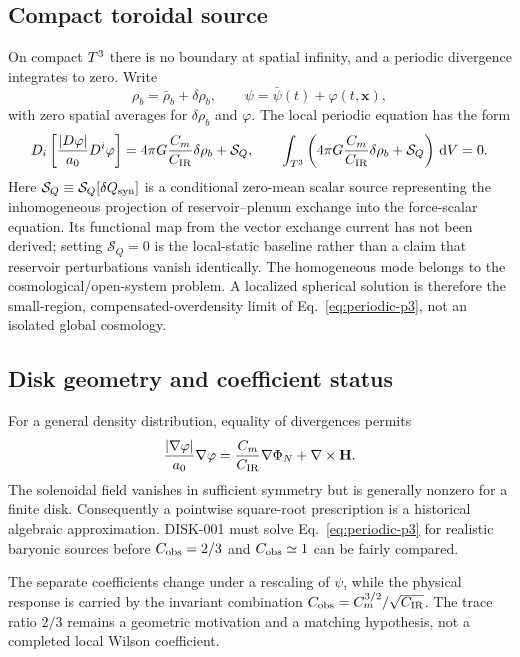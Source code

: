 \subsection{Compact toroidal source}

On compact $T^3$ there is no boundary at spatial infinity, and a periodic
divergence integrates to zero.  Write
\begin{equation}
 \rho_b=\bar\rho_b+\delta\rho_b,
 \qquad
 \psi=\bar\psi(t)+\varphi(t,\mathbf x),
\end{equation}
with zero spatial averages for $\delta\rho_b$ and $\varphi$.  The local
periodic equation has the form
\begin{equation}
 D_i\left[\frac{|D\varphi|}{a_0}D^i\varphi\right]
 =4\pi G\frac{C_m}{C_{\rm IR}}\delta\rho_b+\mathcal S_Q,
 \qquad
 \int_{T^3}\left(4\pi G\frac{C_m}{C_{\rm IR}}
 \delta\rho_b+\mathcal S_Q\right)\,\mathrm d V=0.
 \label{eq:periodic-p3}
\end{equation}
Here $\mathcal S_Q\equiv\mathcal S_Q[\delta Q_{\rm syn}]$ is a conditional
zero-mean scalar source representing the inhomogeneous projection of
reservoir--plenum exchange into the force-scalar equation.  Its functional map from
the vector exchange current has not been derived; setting $\mathcal S_Q=0$ is
the local-static baseline rather than a claim that reservoir perturbations
vanish identically.
The homogeneous mode belongs to the cosmological/open-system problem.  A
localized spherical solution is therefore the small-region,
compensated-overdensity limit of Eq.~\eqref{eq:periodic-p3}, not an isolated
global cosmology.

\subsection{Disk geometry and coefficient status}

For a general density distribution, equality of divergences permits
\begin{equation}
 \frac{|\nabla\varphi|}{a_0}\nabla\varphi
 =\frac{C_m}{C_{\rm IR}}\nabla\Phi_N+\nabla\times\mathbf H.
 \label{eq:curl-field}
\end{equation}
The solenoidal field vanishes in sufficient symmetry but is generally nonzero
for a finite disk.  Consequently a pointwise square-root prescription is a
historical algebraic approximation.  DISK-001 must solve
Eq.~\eqref{eq:periodic-p3} for realistic baryonic sources before
$C_{\rm obs}=2/3$ and $C_{\rm obs}\simeq1$ can be fairly compared.

The separate coefficients change under a rescaling of $\psi$, while the
physical response is carried by the invariant combination
$C_{\rm obs}=C_m^{3/2}/\sqrt{C_{\rm IR}}$.  The trace ratio $2/3$ remains a
geometric motivation and a matching hypothesis, not a completed local Wilson
coefficient.
